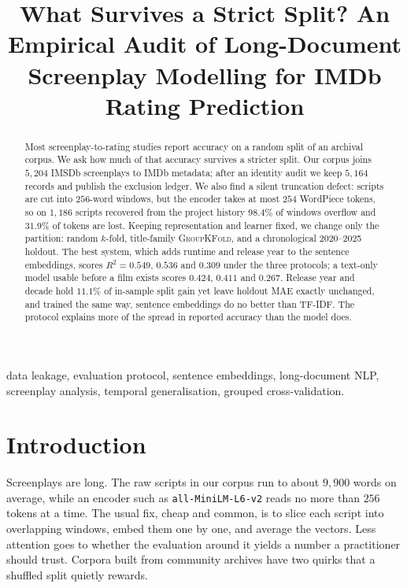 \documentclass[conference,a4paper]{IEEEtran}
\begin{document}
\title{What Survives a Strict Split? An Empirical Audit of
       Long-Document Screenplay Modelling for IMDb Rating Prediction}

\author{}

\maketitle

\begin{abstract}
Most screenplay-to-rating studies report accuracy on a random split of an
archival corpus. We ask how much of that accuracy survives a stricter
split. Our corpus joins $5{,}204$ IMSDb screenplays to IMDb metadata;
after an identity audit we keep $5{,}164$ records and publish the
exclusion ledger. We also find a silent truncation defect: scripts are
cut into $256$-word windows, but the encoder takes at most $254$
WordPiece tokens, so on $1{,}186$ scripts recovered from the project
history $98.4\%$ of windows overflow and $31.9\%$ of tokens are lost.
Keeping representation and learner fixed, we change only the partition:
random $k$-fold, title-family \textsc{GroupKFold}, and a chronological
2020--2025 holdout. The best system, which adds runtime and release year
to the sentence embeddings, scores $R^{2}=0.549$, $0.536$ and $0.309$
under the three protocols; a text-only model usable before a film exists
scores $0.424$, $0.411$ and $0.267$. Release year and decade hold
$11.1\%$ of in-sample split gain yet leave holdout MAE exactly unchanged,
and trained the same way, sentence embeddings do no better than TF-IDF.
The protocol explains more of the spread in reported accuracy than the
model does.
\end{abstract}

\begin{IEEEkeywords}
data leakage, evaluation protocol, sentence embeddings, long-document
NLP, screenplay analysis, temporal generalisation, grouped
cross-validation.
\end{IEEEkeywords}

\section{Introduction}

Screenplays are long. The raw scripts in our corpus run to about
$9{,}900$ words on average, while an encoder such as
\texttt{all-MiniLM-L6-v2} reads no more than $256$ tokens at a time. The
usual fix, cheap and common, is to slice each script into overlapping
windows, embed them one by one, and average the vectors. Less attention
goes to whether the evaluation around it yields a number a practitioner
should trust. Corpora built from community archives have two quirks that
a shuffled split quietly rewards.
\end{document}
